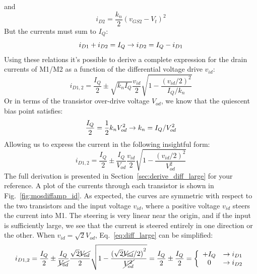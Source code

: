 and
    \begin{equation} 
        {i_{D2}} = \frac{{{k_n}}}{2}{\left( {{v_{GS2}} - {V_t}} \right)^2}
    \end{equation}
But the currents must sum to $I_Q$:
    \begin{equation}
        {i_{D1}} + {i_{D2}} = I_Q \rightarrow {\rm{ }}{i_{D2}} = I_Q - {i_{D1}}
    \end{equation}
Using these relations it's possible to derive a complete expression for the drain currents of M1/M2 as a function of the differential voltage drive $v_{id}$:
    \begin{equation}
        {i_{D1,2}} = \frac{I_Q}{2} \pm \sqrt {{k_n}I_Q} \frac{{{v_{id}}}}{2}\sqrt {1 - \frac{{{{({v_{id}}/2)}^2}}}{{I_Q/{k_n}}}} 
    \end{equation}
Or in terms of the transistor over-drive voltage $V_{od}$, we know that the quiescent bias point satisfies:
    \begin{equation}
        \frac{I_Q}{2} = \frac{1}{2}{k_n}V_{od}^2{\rm{ }} \rightarrow {k_n} = I_Q/V_{od}^2 
    \end{equation}
Allowing us to express the current in the following insightful form:
    \begin{equation} 
        {i_{D1,2}} = \frac{I_Q}{2} \pm \frac{I_Q}{{{V_{od}}}}\frac{{{v_{id}}}}{2}\sqrt {1 - \frac{{{{({v_{id}}/2)}^2}}}{{V_{od}^2}}}
        \label{eq:diff_large}
    \end{equation}
The full derivation is presented in Section~\ref{sec:derive_diff_large} for your reference.  A plot of the currents through each transistor is shown in Fig.~\ref{fig:mosdiffamp_id}.  As expected, the curves are symmetric with respect to the two transistors and the input voltage $v_{id}$, where a positive voltage $v_{id}$ steers the current into M1.  The steering is very linear near the origin, and if the input is sufficiently large, we see that the current is steered entirely in one direction or the other.  When $v_{id} = \sqrt{2} V_{od}$, Eq.~\ref{eq:diff_large} can be simplified:
    \begin{equation} 
        {i_{D1,2}} = \frac{I_Q}{2} \pm \frac{I_Q}{{{\cancel{V_{od}}}}}\frac{{{\sqrt{2} \cancel{V_{od}}}}}{2} \sqrt {1 - \frac{{{{({\sqrt{2}\cancel{V_{od}}}/2)}^2}}}{{\cancel{V_{od}^2}}}}	= \frac{I_Q}{2} \pm \frac{I_Q}{2} = \left\{ \begin{array}{cc} +I_Q &  \to i_{D1} \\ 0 & \to i_{D2} \end{array} \right.
    \end{equation}
